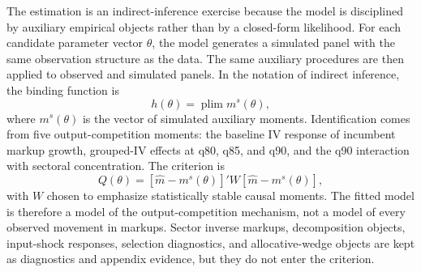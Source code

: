 ﻿\documentclass[12pt]{article}
\begin{document}
The estimation is an indirect-inference exercise because the model is disciplined by auxiliary empirical objects rather than by a closed-form likelihood. For each candidate parameter vector \(\theta\), the model generates a simulated panel with the same observation structure as the data. The same auxiliary procedures are then applied to observed and simulated panels. In the notation of indirect inference, the binding function is
\begin{equation}
    h(\theta)=\operatorname{plim} m^{s}(\theta),
\end{equation}
where \(m^{s}(\theta)\) is the vector of simulated auxiliary moments. Identification comes from five output-competition moments: the baseline IV response of incumbent markup growth, grouped-IV effects at q80, q85, and q90, and the q90 interaction with sectoral concentration. The criterion is
\begin{equation}
Q(\theta)=\left[\widehat m-m^{s}(\theta)\right]'W
\left[\widehat m-m^{s}(\theta)\right],
\end{equation}
with \(W\) chosen to emphasize statistically stable causal moments. The fitted model is therefore a model of the output-competition mechanism, not a model of every observed movement in markups. Sector inverse markups, decomposition objects, input-shock responses, selection diagnostics, and allocative-wedge objects are kept as diagnostics and appendix evidence, but they do not enter the criterion.
\end{document}
